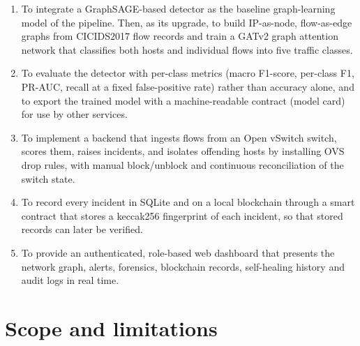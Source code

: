 \documentclass[12pt,a4paper]{report}
\begin{document}
\begin{enumerate}
\item {To integrate a GraphSAGE-based detector as the baseline graph-learning model of the pipeline. Then, as its upgrade, to build IP-as-node, flow-as-edge graphs from CICIDS2017 flow records and train a GATv2 graph attention network that classifies both hosts and individual flows into five traffic classes.}
\item {To evaluate the detector with per-class metrics (macro F1-score, per-class F1, PR-AUC, recall at a fixed false-positive rate) rather than accuracy alone, and to export the trained model with a machine-readable contract (model card) for use by other services.}
\item {To implement a backend that ingests flows from an Open vSwitch switch, scores them, raises incidents, and isolates offending hosts by installing OVS drop rules, with manual block/unblock and continuous reconciliation of the switch state.}
\item {To record every incident in SQLite and on a local blockchain through a smart contract that stores a keccak256 fingerprint of each incident, so that stored records can later be verified.}
\item {To provide an authenticated, role-based web dashboard that presents the network graph, alerts, forensics, blockchain records, self-healing history and audit logs in real time.}
\end{enumerate}

\section{Scope and limitations}
\end{document}
